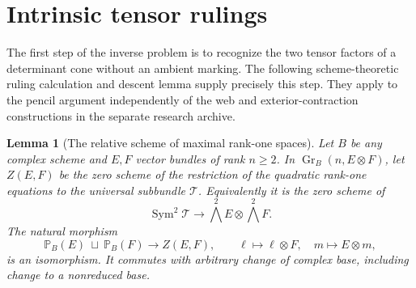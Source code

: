 \documentclass[11pt,reqno]{amsart}
\numberwithin{equation}{section}
\newtheorem{lemma}[theorem]{Lemma}
\theoremstyle{definition}\newtheorem{definition}[theorem]{Definition}
\theoremstyle{remark}\newtheorem{remark}[theorem]{Remark}
\newcommand{\Pj}{\mathbb P}\newcommand{\A}{\mathbb A}
\DeclareMathOperator{\Sym}{Sym}\DeclareMathOperator{\Gr}{Gr}
\begin{document}
\section{Intrinsic tensor rulings}
\label{sec:ruling-foundations-v143}
The first step of the inverse problem is to recognize the two tensor
factors of a determinant cone without an ambient marking.  The following
scheme-theoretic ruling calculation and descent lemma supply precisely
this step.  They apply to the pencil argument independently of the web
and exterior-contraction constructions in the separate research archive.

\begin{lemma}[The relative scheme of maximal rank-one spaces]
\label{lem:rank-one-fano-scheme}
Let \(B\) be any complex scheme and \(E,F\) vector bundles of
rank \(n\ge2\).  In \(\Gr_B(n,E\otimes F)\), let
\(Z(E,F)\) be the zero scheme of the restriction of the quadratic
rank-one equations to the universal subbundle \(\mathcal T\).
Equivalently it is the zero scheme of
\[
 \Sym^2\mathcal T\longrightarrow
              \bigwedge^2E\otimes\bigwedge^2F.
\]
The natural morphism
\begin{equation}\label{eq:fano-rank-one-scheme}
 \Pj_B(E)\ \sqcup\ \Pj_B(F)\longrightarrow Z(E,F),
 \qquad \ell\mapsto\ell\otimes F,
 \quad m\mapsto E\otimes m,
\end{equation}
is an isomorphism.  It commutes with arbitrary change of complex
base, including change to a nonreduced base.
\end{lemma}
\end{document}
